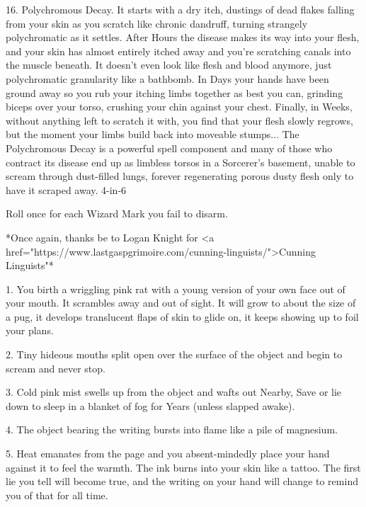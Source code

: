 16. Polychromous Decay. It starts with a dry itch, dustings of dead flakes falling from your skin as you scratch like chronic dandruff, turning strangely polychromatic as it settles. After Hours the disease makes its way into your flesh, and your skin has almost entirely itched away and you're scratching canals into the muscle beneath. It doesn't even look like flesh and blood anymore, just polychromatic granularity like a bathbomb.  In Days your hands have been ground away so you rub your itching limbs together as best you can, grinding biceps over your torso, crushing your chin against your chest.  Finally, in Weeks, without anything left to scratch it with, you find that your flesh slowly regrows, but the moment your limbs build back into moveable stumps... The Polychromous Decay is a powerful spell component and many of those who contract its disease end up as limbless torsos in a Sorcerer's basement, unable to scream through dust-filled lungs, forever regenerating porous dusty flesh only to have it scraped away. 4-in-6









Roll once for each Wizard Mark you fail to disarm.  

*Once again, thanks be to Logan Knight for  <a href="https://www.lastgaspgrimoire.com/cunning-linguists/">Cunning Linguists"*





1. You birth a wriggling pink rat with a young version of your own face out of your mouth. It scrambles away and out of sight. It will grow to about the size of a pug, it develops translucent flaps of skin to glide on, it keeps showing up to foil your plans.



2. Tiny hideous mouths split open over the surface of the object and begin to scream and never stop.



3. Cold pink mist swells up from the object and wafts out Nearby, Save or lie down to sleep in a blanket of fog for Years (unless slapped awake).



4. The object bearing the writing bursts into flame like a pile of magnesium.



5. Heat emanates from the page and you absent-mindedly place your hand against it to feel the warmth. The ink burns into your skin like a tattoo. The first lie you tell will become true, and the writing on your hand will change to remind you of that for all time.




